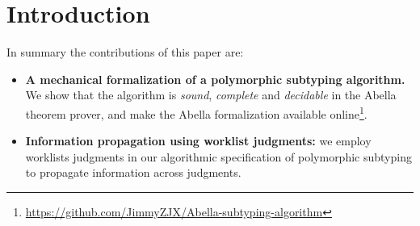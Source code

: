 \section{Introduction}



%


In summary the contributions of this paper are:

\begin{itemize}
\item {\bf A mechanical formalization of a polymorphic subtyping
    algorithm.} We show that the algorithm is \emph{sound},
  \emph{complete} and \emph{decidable} in the Abella theorem prover,
  and make the Abella formalization available online\footnote{\url{https://github.com/JimmyZJX/Abella-subtyping-algorithm}}.

\item {\bf Information propagation using worklist judgments:} we
  employ worklists judgments in our algorithmic specification of polymorphic subtyping
  to propagate information across judgments.

\end{itemize}
